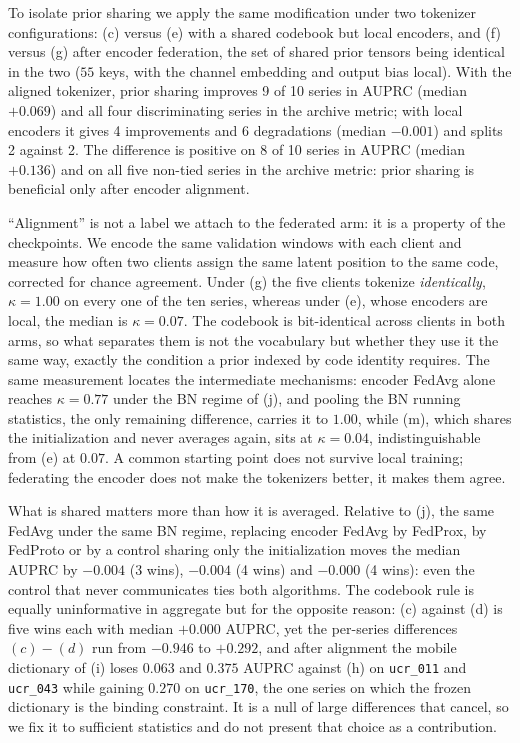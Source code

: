 \documentclass[conference]{IEEEtran}
\begin{document}
To isolate prior sharing we apply the same modification under two tokenizer configurations: (c)
versus (e) with a shared codebook but local encoders, and (f) versus (g) after encoder federation,
the set of shared prior tensors being identical in the two ($55$ keys, with the channel embedding
and output bias local). With the aligned tokenizer, prior sharing improves 9 of 10 series in AUPRC
(median $+0.069$) and all four discriminating series in the archive metric; with local encoders it
gives 4 improvements and 6 degradations (median $-0.001$) and splits 2 against 2. The difference is
positive on 8 of 10 series in AUPRC (median $+0.136$) and on all five non-tied series in the archive
metric: prior sharing is beneficial only after encoder alignment.

``Alignment'' is not a label we attach to the federated arm: it is a property of the checkpoints. We
encode the same validation windows with each client and measure how often two clients assign the
same latent position to the same code, corrected for chance agreement. Under (g) the five clients
tokenize \emph{identically}, $\kappa=1.00$ on every one of the ten series, whereas under (e), whose
encoders are local, the median is $\kappa=0.07$. The
codebook is bit-identical across clients in both arms, so what separates them is not the vocabulary
but whether they use it the same way, exactly the condition a prior indexed by code identity
requires. The same measurement locates the intermediate mechanisms: encoder FedAvg alone reaches
$\kappa=0.77$ under the BN regime of (j), and pooling the BN running statistics, the only remaining
difference, carries it to $1.00$, while (m), which shares the initialization and never averages
again, sits at $\kappa=0.04$, indistinguishable from (e) at $0.07$. A common starting point does not
survive local training; federating the encoder does not make the tokenizers better, it makes them
agree.

What is shared matters more than how it is averaged. Relative to (j), the same FedAvg under the same
BN regime, replacing encoder FedAvg by FedProx, by FedProto or by a control sharing only the
initialization moves the median AUPRC by $-0.004$ (3 wins), $-0.004$ (4 wins) and $-0.000$ (4 wins):
even the control that never communicates ties both algorithms. The codebook rule is equally
uninformative in aggregate but for the opposite reason:
(c) against (d) is five wins each with median $+0.000$ AUPRC, yet the per-series differences
$(c)-(d)$ run from $-0.946$ to $+0.292$, and after alignment the mobile dictionary of (i) loses
$0.063$ and $0.375$ AUPRC against (h) on \texttt{ucr\_011} and \texttt{ucr\_043} while gaining
$0.270$ on \texttt{ucr\_170}, the one series
on which the frozen dictionary is the binding constraint. It is a null of large differences that
cancel, so we fix it to sufficient
statistics and do not present that choice as a contribution.
\end{document}
